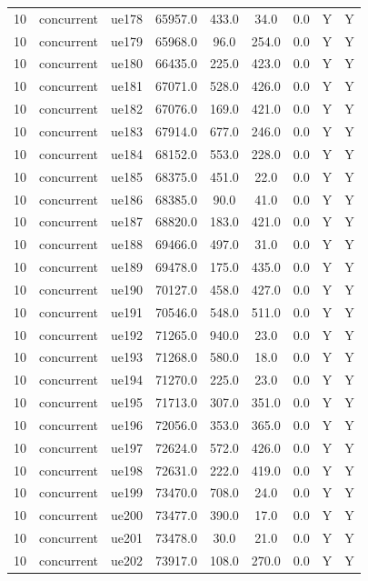 \begin{table}[ht]
\begin{tabular}{|c|c|c|c|c|c|c|c|c|}
10 & concurrent & ue178 & 65957.0 & 433.0 & 34.0 & 0.0 & Y & Y \\
10 & concurrent & ue179 & 65968.0 & 96.0 & 254.0 & 0.0 & Y & Y \\
10 & concurrent & ue180 & 66435.0 & 225.0 & 423.0 & 0.0 & Y & Y \\
10 & concurrent & ue181 & 67071.0 & 528.0 & 426.0 & 0.0 & Y & Y \\
10 & concurrent & ue182 & 67076.0 & 169.0 & 421.0 & 0.0 & Y & Y \\
10 & concurrent & ue183 & 67914.0 & 677.0 & 246.0 & 0.0 & Y & Y \\
10 & concurrent & ue184 & 68152.0 & 553.0 & 228.0 & 0.0 & Y & Y \\
10 & concurrent & ue185 & 68375.0 & 451.0 & 22.0 & 0.0 & Y & Y \\
10 & concurrent & ue186 & 68385.0 & 90.0 & 41.0 & 0.0 & Y & Y \\
10 & concurrent & ue187 & 68820.0 & 183.0 & 421.0 & 0.0 & Y & Y \\
10 & concurrent & ue188 & 69466.0 & 497.0 & 31.0 & 0.0 & Y & Y \\
10 & concurrent & ue189 & 69478.0 & 175.0 & 435.0 & 0.0 & Y & Y \\
10 & concurrent & ue190 & 70127.0 & 458.0 & 427.0 & 0.0 & Y & Y \\
10 & concurrent & ue191 & 70546.0 & 548.0 & 511.0 & 0.0 & Y & Y \\
10 & concurrent & ue192 & 71265.0 & 940.0 & 23.0 & 0.0 & Y & Y \\
10 & concurrent & ue193 & 71268.0 & 580.0 & 18.0 & 0.0 & Y & Y \\
10 & concurrent & ue194 & 71270.0 & 225.0 & 23.0 & 0.0 & Y & Y \\
10 & concurrent & ue195 & 71713.0 & 307.0 & 351.0 & 0.0 & Y & Y \\
10 & concurrent & ue196 & 72056.0 & 353.0 & 365.0 & 0.0 & Y & Y \\
10 & concurrent & ue197 & 72624.0 & 572.0 & 426.0 & 0.0 & Y & Y \\
10 & concurrent & ue198 & 72631.0 & 222.0 & 419.0 & 0.0 & Y & Y \\
10 & concurrent & ue199 & 73470.0 & 708.0 & 24.0 & 0.0 & Y & Y \\
10 & concurrent & ue200 & 73477.0 & 390.0 & 17.0 & 0.0 & Y & Y \\
10 & concurrent & ue201 & 73478.0 & 30.0 & 21.0 & 0.0 & Y & Y \\
10 & concurrent & ue202 & 73917.0 & 108.0 & 270.0 & 0.0 & Y & Y \\

\end{tabular}
\end{table}
